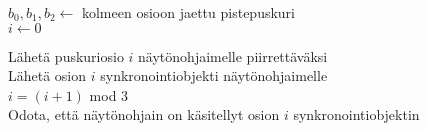 \perusalgoritmi


$b_0, b_1, b_2 \gets$ kolmeen osioon jaettu pistepuskuri\\
$i \gets 0$ 

 {
     {
        Lähetä puskuriosio $i$ näytönohjaimelle piirrettäväksi\\
        Lähetä osion $i$ synkronointiobjekti näytönohjaimelle\\
        $i = (i + 1)$ mod $3$\\
        Odota, että näytönohjain on käsitellyt osion $i$ synkronointiobjektin
    }
}